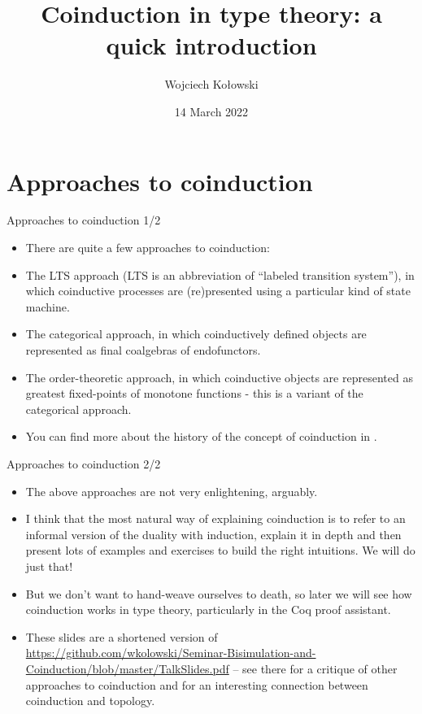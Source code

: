 \documentclass{beamer}
\title{Coinduction in type theory: a quick introduction}
\author{Wojciech Kołowski}
\date{14 March 2022}
\begin{document}
\frame{\titlepage}
\frame{\tableofcontents}

\section{Approaches to coinduction}

\begin{frame}{Approaches to coinduction 1/2}
\begin{itemize}
	\item There are quite a few approaches to coinduction:
	\item The LTS approach (LTS is an abbreviation of ``labeled transition system''), in which coinductive processes are (re)presented using a particular kind of state machine.
	\item The categorical approach, in which coinductively defined objects are represented as final coalgebras of endofunctors.
	\item The order-theoretic approach, in which coinductive objects are represented as greatest fixed-points of monotone functions - this is a variant of the categorical approach.
	\item You can find more about the history of the concept of coinduction in \href{https://dl.acm.org/doi/pdf/10.1145/1516507.1516510}{\color{blue}{On the Origins of Bisimulation and
  Coinduction}}.
\end{itemize}
\end{frame}

\begin{frame}{Approaches to coinduction 2/2}
\begin{itemize}
	\item The above approaches are not very enlightening, arguably.
	\item I think that the most natural way of explaining coinduction is to refer to an informal version of the duality with induction, explain it in depth and then present lots of examples and exercises to build the right intuitions. We will do just that!
  \item But we don't want to hand-weave ourselves to death, so later we will see how coinduction works in type theory, particularly in the Coq proof assistant.
  \item These slides are a shortened version of \url{https://github.com/wkolowski/Seminar-Bisimulation-and-Coinduction/blob/master/TalkSlides.pdf} -- see there for a critique of other approaches to coinduction and for an interesting connection between coinduction and topology.
\end{itemize}
\end{frame}
\end{document}
